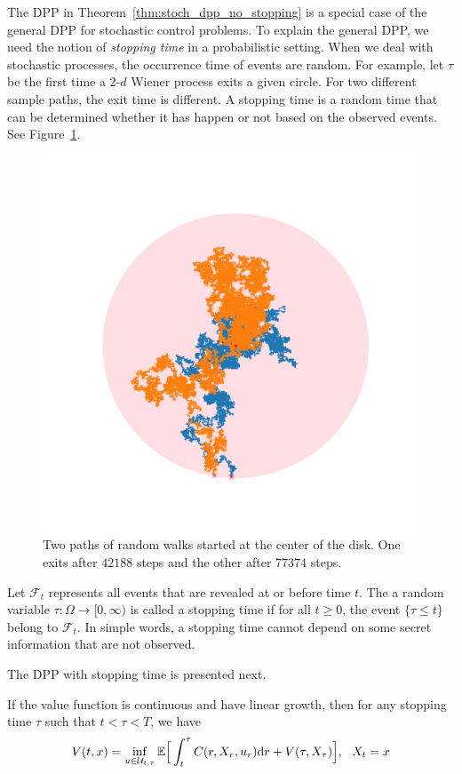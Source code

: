 \documentclass[11pt]{book}
\newcommand{\dr}{\text{\normalfont d}r}
\begin{document}
The DPP in Theorem~\ref{thm:stoch_dpp_no_stopping} is a special case of the general DPP for stochastic control problems. To explain the general DPP, we need the notion of \emph{stopping time} in a probabilistic setting. When we deal with stochastic processes, the occurrence time of events are random. For example, let $\tau$ be the first time a 2-$d$ Wiener process exits a given circle.  For two different sample paths, the exit time is different.
A stopping time is a random time that can be determined whether it has happen or not based on the observed events. See Figure~\ref{fig:exit_time}.
\begin{figure}[ht!]
    \centering
    \includegraphics[width=0.5\linewidth]{Control_lecture_notes/Figs/bm_2d_hitting_time.png}
    \caption{Two paths of random walks started at the center of the disk. One exits after $42188$ steps  and the other after $77374$ steps.}
    \label{fig:exit_time}
\end{figure}
\begin{defn}
Let $\mathcal{F}_t$ represents all events that are revealed at or before time $t$. The a random variable $\tau:\Omega\to[0,\infty)$ is called a stopping time if for all $t\ge0$, the event $\{\tau\le t\}$ belong to $\mathcal{F}_t$.
    In simple words, a stopping time cannot depend on some secret information that are not observed. 
\end{defn}
The DPP with stopping time is presented next.
\begin{thm}\label{thm:stoch_dpp_stopping}
    If the value function is continuous and have linear growth, then for any stopping time $\tau$ such that $t<\tau<T$, we have 
    \begin{equation}\label{eqn:stoch_dpp_stopping}
        V(t,x)= \inf_{u\in\mathcal{U}_{t,\tau}}\mathbb{E}\Big[\int_t^\tau C(r,X_r,u_r){\dr} + V(\tau,X_\tau)\Big],~~X_t=x
    \end{equation}
\end{thm}
\end{document}

